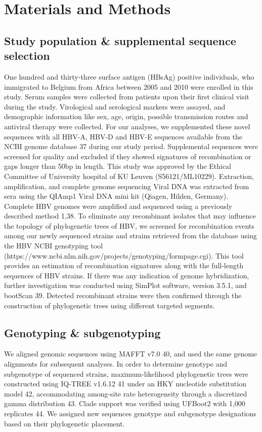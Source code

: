 \section{Materials and Methods}
\subsection{Study population \& supplemental sequence selection}
One hundred and thirty-three surface antigen (HBsAg) positive individuals, who immigrated to Belgium from Africa between 2005 and 2010 were enrolled in this study. Serum samples were collected from patients upon their first clinical visit during the study. Virological and serological markers were assayed, and demographic information like sex, age, origin, possible transmission routes and antiviral therapy were collected. For our analyses, we supplemented these novel sequences with all HBV-A, HBV-D and HBV-E sequences available from the NCBI genome database 37 during our study period. Supplemental sequences were screened for quality and excluded if they showed signatures of recombination or gaps longer than 50bp in length. This study was approved by the Ethical Committee of University hospital of KU Leuven (S56121/ML10229).
Extraction, amplification, and complete genome sequencing
Viral DNA was extracted from sera using the QIAmp1 Viral DNA mini kit (Qiagen, Hilden, Germany). Complete HBV genomes were amplified and sequenced using a previously described method 1,38. To eliminate any recombinant isolates that may influence the topology of phylogenetic trees of HBV, we screened for recombination events among our newly sequenced strains and strains retrieved from the database using the HBV NCBI genotyping tool (https://www.ncbi.nlm.nih.gov/projects/genotyping/formpage.cgi). This tool provides an estimation of recombination signatures along with the full-length sequences of HBV strains. If there was any indication of genome hybridization, further investigation was conducted using SimPlot software, version 3.5.1, and bootScan 39. Detected recombinant strains were then confirmed through the construction of phylogenetic trees using different targeted segments.

\subsection{Genotyping \& subgenotyping}
We aligned genomic sequences using MAFFT v7.0 40, and used the same genome alignments for subsequent analyses. In order to determine genotype and subgenotype of sequenced strains, maximum-likelihood phylogenetic trees were constructed using IQ-TREE v1.6.12 41 under an HKY nucleotide substitution model 42, accommodating among-site rate heterogeneity through a discretized gamma distribution 43. Clade support was verified using UFBoot2 with 1,000 replicates 44. We assigned new sequences genotype and subgenotype designations based on their phylogenetic placement.

